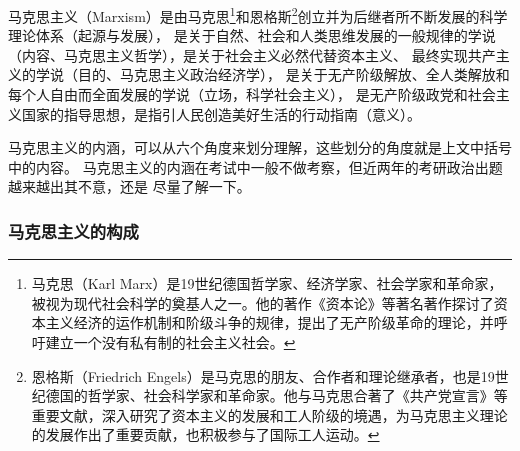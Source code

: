 \documentclass[10pt, UTF8]{book} %
\begin{document}
马克思主义（Marxism）是由马克思\footnote{
    马克思（Karl Marx）是19世纪德国哲学家、经济学家、社会学家和革命家，被视为现代社会科学的奠基人之一。他的著作《资本论》等著名著作探讨了资本主义经济的运作机制和阶级斗争的规律，提出了无产阶级革命的理论，并呼吁建立一个没有私有制的社会主义社会。
}和恩格斯\footnote{
    恩格斯（Friedrich Engels）是马克思的朋友、合作者和理论继承者，也是19世纪德国的哲学家、社会科学家和革命家。他与马克思合著了《共产党宣言》等重要文献，深入研究了资本主义的发展和工人阶级的境遇，为马克思主义理论的发展作出了重要贡献，也积极参与了国际工人运动。
}创立并为后继者所不断发展的科学理论体系（起源与发展），
是关于自然、社会和人类思维发展的一般规律的学说（内容、马克思主义哲学），是关于社会主义必然代替资本主义、
最终实现共产主义的学说（目的、马克思主义政治经济学），
是关于无产阶级解放、全人类解放和每个人自由而全面发展的学说（立场，科学社会主义），
是无产阶级政党和社会主义国家的指导思想，是指引人民创造美好生活的行动指南（意义）。
\begin{remark}
    马克思主义的内涵，可以从六个角度来划分理解，这些划分的角度就是上文中括号中的内容。
    马克思主义的内涵在考试中一般不做考察，但近两年的考研政治出题越来越出其不意，还是
    尽量了解一下。
\end{remark}

\subsubsection{马克思主义的构成}
\end{document}
